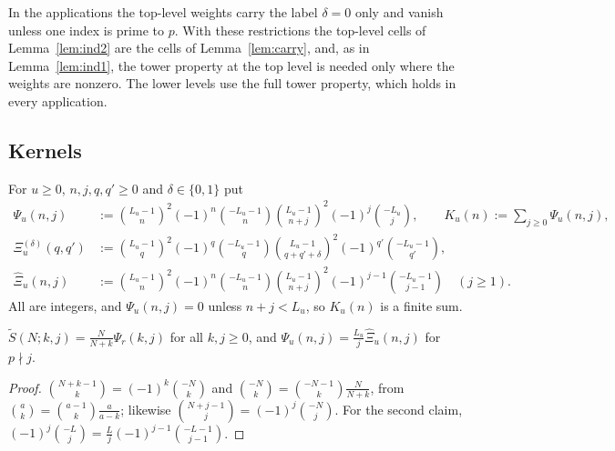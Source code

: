 \documentclass[11pt]{amsart}
\begin{document}
In the applications the top-level weights carry the label $\delta=0$ only and vanish unless one index is prime to $p$. With these restrictions the top-level cells of Lemma~\ref{lem:ind2} are the cells of Lemma~\ref{lem:carry}, and, as in Lemma~\ref{lem:ind1}, the tower property at the top level is needed only where the weights are nonzero. The lower levels use the full tower property, which holds in every application.

\subsection{Kernels}
For $u\ge0$, $n,j,q,q'\ge0$ and $\delta\in\{0,1\}$ put
\begin{align*}
\Psi_u(n,j)&:=\binom{L_u-1}n^2(-1)^n\binom{-L_u-1}n\binom{L_u-1}{n+j}^2(-1)^j\binom{-L_u}j,\qquad K_u(n):=\sum_{j\ge0}\Psi_u(n,j),\\
\Xi^{(\delta)}_u(q,q')&:=\binom{L_u-1}q^2(-1)^q\binom{-L_u-1}q\binom{L_u-1}{q+q'+\delta}^2(-1)^{q'}\binom{-L_u-1}{q'},\\
\hat\Xi_u(n,j)&:=\binom{L_u-1}n^2(-1)^n\binom{-L_u-1}n\binom{L_u-1}{n+j}^2(-1)^{j-1}\binom{-L_u-1}{j-1}\quad(j\ge1).
\end{align*}
All are integers, and $\Psi_u(n,j)=0$ unless $n+j<L_u$, so $K_u(n)$ is a finite sum.

\begin{lemma}\label{lem:factor}
$\tilde S(N;k,j)=\frac N{N+k}\Psi_r(k,j)$ for all $k,j\ge0$, and $\Psi_u(n,j)=\frac{L_u}j\hat\Xi_u(n,j)$ for $p\nmid j$.
\end{lemma}
\begin{proof}
$\binom{N+k-1}k=(-1)^k\binom{-N}k$ and $\binom{-N}k=\binom{-N-1}k\frac N{N+k}$, from $\binom ak=\binom{a-1}k\frac a{a-k}$; likewise $\binom{N+j-1}j=(-1)^j\binom{-N}j$. For the second claim, $(-1)^j\binom{-L}j=\frac Lj(-1)^{j-1}\binom{-L-1}{j-1}$.
\end{proof}
\end{document}
